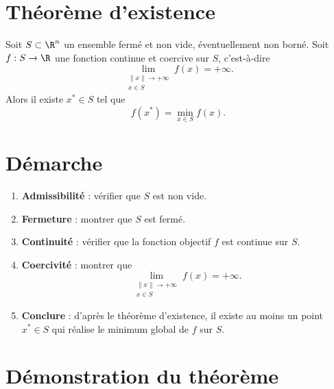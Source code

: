 
\section{Théorème d'existence}

\begin{theorem}
Soit $S\subset\R^n$ un ensemble fermé et non vide, éventuellement non borné. Soit $f:S\to\R$ une fonction continue et coercive sur $S$, c'est-à-dire
\[
\lim_{\substack{\|x\|\to+\infty\\x\in S}}f(x)=+\infty.
\]
Alors il existe $x^*\in S$ tel que
\[
\boxed{f(x^*)=\min_{x\in S}f(x).}
\]
\end{theorem}

\section{Démarche}

\begin{methode}
\begin{enumerate}[label=\textbf{Étape \arabic*.}]
    \item \textbf{Admissibilité} : vérifier que $S$ est non vide.

    \item \textbf{Fermeture} : montrer que $S$ est fermé.

    \item \textbf{Continuité} : vérifier que la fonction objectif $f$ est continue sur $S$.

    \item \textbf{Coercivité} : montrer que
    \[
    \lim_{\substack{\|x\|\to+\infty\\x\in S}}f(x)=+\infty.
    \]

    \item \textbf{Conclure} : d'après le théorème d'existence, il existe au moins un point $x^*\in S$ qui réalise le minimum global de $f$ sur $S$.
\end{enumerate}
\end{methode}

\section{Démonstration du théorème}

